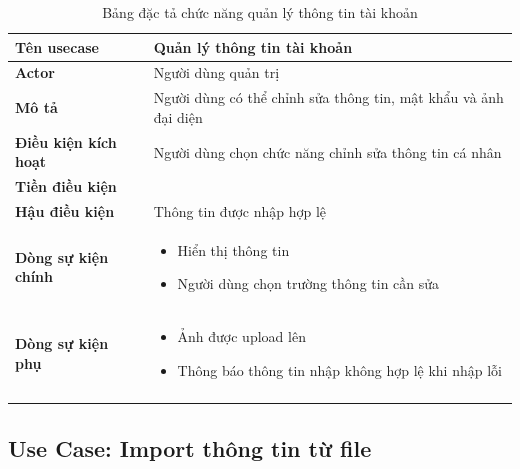 \documentclass[report.tex]{subfiles}
\begin{document}
\begin{table}[!ht]
\begin{longtable}{|p{4cm}|p{12cm}|}
\hline
\textbf{Tên usecase} & \textbf{Quản lý thông tin tài khoản} \\
\hline
\textbf{Actor} & Người dùng quản trị \\
\hline
\textbf{Mô tả} & Người dùng có thể chỉnh sửa thông tin, mật khẩu và ảnh đại diện \\
\hline
\textbf{Điều kiện kích hoạt} & Người dùng chọn chức năng chỉnh sửa thông tin cá nhân \\
\hline
\textbf{Tiền điều kiện} &  \\
\hline
\textbf{Hậu điều kiện} & Thông tin được nhập hợp lệ \\
\hline
\textbf{Dòng sự kiện chính} &
\begin{itemize}[noitemsep]
  \item Hiển thị thông tin
  \item Người dùng chọn trường thông tin cần sửa
\end{itemize}\\
\hline
\textbf{Dòng sự kiện phụ} & 
\begin{itemize}[noitemsep]
  \item Ảnh được upload lên
  \item Thông báo thông tin nhập không hợp lệ khi nhập lỗi
\end{itemize}\\
\hline
\caption{Bảng đặc tả chức năng quản lý thông tin tài khoản}
\end{longtable}
\end{table}
\FloatBarrier

\subsection{Use Case: Import thông tin từ file}
\end{document}
